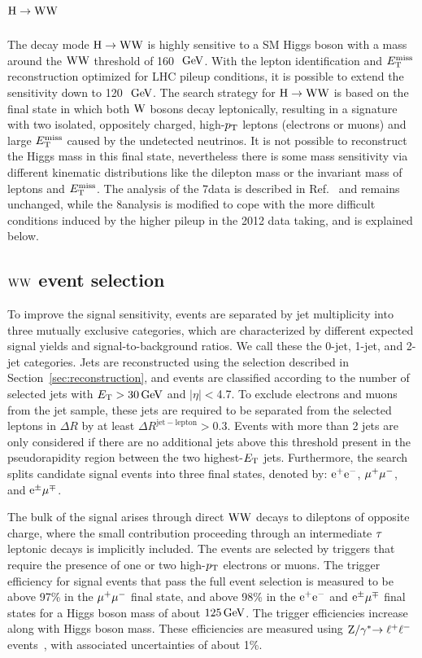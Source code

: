 \documentclass[11pt,twoside,a4paper,cmspaper,final,collab]{cms-tdr}
\begin{document}
\section{\texorpdfstring{$\mathrm{H}\to\mathrm{W}\mathrm{W}$}{H to WW}\label{sec:hww2l2nu}}
The decay mode $\mathrm{H}\to\mathrm{W}\mathrm{W}$ is highly sensitive to
a SM Higgs boson with a mass around the $\mathrm{W}\mathrm{W}$ threshold of
160~$\,\text{Ge\hspace{-.08em}V}$. With the lepton identification and
$E_{\mathrm{T}}^{\text{miss}}$ reconstruction optimized for LHC pileup conditions, it is possible
to extend the sensitivity down to 120~$\,\text{Ge\hspace{-.08em}V}$. The search strategy for $\mathrm{H}\to\mathrm{W}\mathrm{W}$
is based on the final state in which both $\mathrm{W}$ bosons decay leptonically,
resulting in a signature with two isolated, oppositely charged, high-$p_{\mathrm{T}}$
leptons (electrons or muons) and large $E_{\mathrm{T}}^{\text{miss}}$ caused by the undetected neutrinos.
It is not possible to reconstruct the Higgs mass in this final state, nevertheless
there is some mass sensitivity via different kinematic distributions like the
dilepton mass or the invariant mass of leptons and $E_{\mathrm{T}}^{\text{miss}}$.
The analysis of the 7\TeV data is described in Ref.~\cite{Chatrchyan:2012ty}
and remains unchanged, while the 8\TeV analysis is modified to cope with
the more difficult conditions induced by the higher pileup in the 2012 data
taking, and is explained below.


\subsection{\texorpdfstring{$\mathrm{W}\mathrm{W}$}{WW} event selection}
\label{sec:ww_evtsel}
To improve the signal sensitivity, events are separated by jet
multiplicity into three mutually exclusive categories, which are characterized
by different expected signal yields and signal-to-background ratios.
We call these the 0-jet, 1-jet, and 2-jet categories.
Jets are reconstructed using the selection described in
Section~\ref{sec:reconstruction}, and events are classified according to the
number of selected jets with $E_{\mathrm{T}}>30\,\text{Ge\hspace{-.08em}V}$ and $|\eta|<$4.7.
To exclude electrons and muons from the jet sample, these
jets are required to be separated from the selected leptons in $\Delta R$
by at least $\Delta R^{\mathrm{jet-lepton}}>0.3$.
Events with more than 2 jets are only considered if there are no
additional jets above this threshold present in the pseudorapidity
region between the two highest-$E_{\mathrm{T}}$ jets.
Furthermore, the search splits candidate signal events into
three final states, denoted by: $\mathrm{e}^+\mathrm{e}^-$, ${\mu^+}{\mu^-}$, and $\mathrm{e}^{\pm}{\mu}^{\mp}$.

The bulk of the signal arises through direct $\mathrm{W}\mathrm{W}$ decays to dileptons
of opposite charge, where the small contribution
proceeding through an intermediate $\tau$ leptonic decays is implicitly included.
The events are selected by triggers that  require
the presence of one or two high-$p_{\mathrm{T}}$ electrons or muons.
The trigger efficiency for signal events that pass the full event selection
is measured to be above 97\% in the ${\mu^+}{\mu^-}$ final state, and above 98\% in the
$\mathrm{e}^+\mathrm{e}^-$ and $\mathrm{e}^{\pm}{\mu}^{\mp}$ final states for a Higgs boson mass of about $125\,\text{Ge\hspace{-.08em}V}$.
The trigger efficiencies increase along with Higgs boson mass. These
efficiencies are measured using $\mathrm{Z}/\gamma^*{\to \ell^+\ell^-}$ events~\cite{CMS:2011aa}, with associated
uncertainties of about 1\%.
\end{document}

